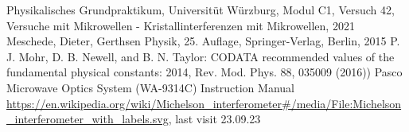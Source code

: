 \documentclass[a4paper,10pt,twocolumn]{article}
\begin{document}
    
    \begin{thebibliography}{}    %
         Physikalisches Grundpraktikum, Universitüt Würzburg, Modul C1, Versuch 42, Versuche mit Mikrowellen - Kristallinterferenzen mit Mikrowellen, 2021
         Meschede, Dieter, Gerthsen Physik, 25. Auflage, Springer-Verlag, Berlin, 2015
         P. J. Mohr, D. B. Newell, and B. N. Taylor: \grqq CODATA
        recommended values of the fundamental physical constants: 2014\grqq , Rev. Mod. Phys.
        88, 035009 (2016))
         Pasco Microwave Optics System (WA-9314C) Instruction Manual
         \url{https://en.wikipedia.org/wiki/Michelson_interferometer#/media/File:Michelson_interferometer_with_labels.svg}, last visit 23.09.23
    \end{thebibliography}
    
\end{document}

